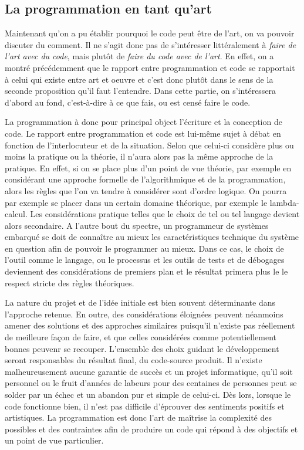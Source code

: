 \documentclass[12pt]{article} %
\begin{document}
\subsection{La programmation en tant qu'art} %
Maintenant qu'on a pu établir pourquoi le code peut être de l'art, on va pouvoir discuter du comment. Il ne s'agit donc pas de s'intéresser littéralement à \textit{faire de l'art avec du code}, mais plutôt de \textit{faire du code avec de l'art}. En effet, on a montré précédemment que le rapport entre programmation et code se rapportait à celui qui existe entre art et oeuvre et c'est donc plutôt dans le sens de la seconde proposition qu'il faut l'entendre. Dans cette partie, on s'intéressera d'abord au fond, c'est-à-dire à ce que fais, ou est censé faire le code. 

La programmation à donc pour principal object l'écriture et la conception de code. Le rapport entre programmation et code est lui-même sujet à débat en fonction de l'interlocuteur et de la situation. Selon que celui-ci considère plus ou moins la pratique ou la théorie, il n'aura alors pas la même approche de la pratique. En effet, si on se place plus d'un point de vue théorie, par exemple en considérant une approche formelle de l'algorithmique et de la programmation, alors les règles que l'on va tendre à considérer sont d'ordre logique. On pourra par exemple se placer dans un certain domaine théorique, par exemple le lambda-calcul. Les considérations pratique telles que le choix de tel ou tel langage devient alors secondaire. A l'autre bout du spectre, un programmeur de systèmes embarqué se doit de connaître au mieux les caractéristiques technique du système en question afin de pouvoir le programmer au mieux. Dans ce cas, le choix de l'outil comme le langage, ou le processus et les outils de tests et de débogages deviennent des considérations de premiers plan et le résultat primera plus le le respect stricte des règles théoriques. 

La nature du projet et de l'idée initiale est bien souvent déterminante dans l'approche retenue. En outre, des considérations éloignées peuvent néanmoins amener des solutions et des approches similaires puisqu'il n'existe pas réellement de meilleure façon de faire, et que celles considérées comme potentiellement bonnes peuvenr se recouper. L'ensemble des choix guidant le développement seront responsables du résultat final, du code-source produit. Il n'existe malheureusement aucune garantie de succès et un projet informatique, qu'il soit personnel ou le fruit d'années de labeurs pour des centaines de personnes peut se solder par un échec et un abandon pur et simple de celui-ci. Dès lors, lorsque le code fonctionne bien, il n'est pas difficile d'éprouver des sentiments positifs et artistiques. La programmation est donc l'art de maîtrise la complexité des possibles et des contraintes afin de produire un code qui répond à des objectifs et un point de vue particulier.
\end{document}
